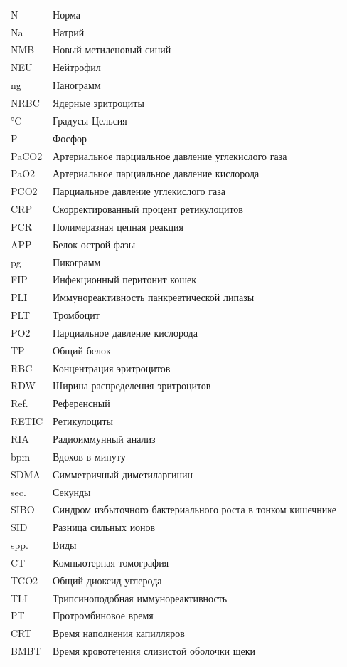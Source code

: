 \documentclass[a4paper,12pt]{book}
\begin{document}
\begin{longtable}{p{4cm} p{10cm}}
N & Норма \\
Na & Натрий \\
NMB & Новый метиленовый синий \\
NEU & Нейтрофил \\
ng & Нанограмм \\
NRBC & Ядерные эритроциты \\
°C & Градусы Цельсия \\
P & Фосфор \\
PaCO2 & Артериальное парциальное давление углекислого газа \\
PaO2 & Артериальное парциальное давление кислорода \\
PCO2 & Парциальное давление углекислого газа \\
CRP & Скорректированный процент ретикулоцитов \\
PCR & Полимеразная цепная реакция \\
APP & Белок острой фазы \\
pg & Пикограмм \\
FIP & Инфекционный перитонит кошек \\
PLI & Иммунореактивность панкреатической липазы \\
PLT & Тромбоцит \\
PO2 & Парциальное давление кислорода \\
TP & Общий белок \\
RBC & Концентрация эритроцитов \\
RDW & Ширина распределения эритроцитов \\
Ref. & Референсный \\
RETIC & Ретикулоциты \\
RIA & Радиоиммунный анализ \\
bpm & Вдохов в минуту \\
SDMA & Симметричный диметиларгинин \\
sec. & Секунды \\
SIBO & Синдром избыточного бактериального роста в тонком кишечнике \\
SID & Разница сильных ионов \\
spp. & Виды \\
CT & Компьютерная томография \\
TCO2 & Общий диоксид углерода \\
TLI & Трипсиноподобная иммунореактивность \\
PT & Протромбиновое время \\
CRT & Время наполнения капилляров \\
BMBT & Время кровотечения слизистой оболочки щеки \\

\end{longtable}
\end{document}
